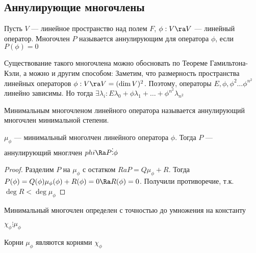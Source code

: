 \subsection{Аннулирующие многочлены}
\begin{definition}
    Пусть \(V\) --- линейное пространство над полем \(F\), \(\phi: V \ra V\) --- линейный оператор. Многочлен \(P\) называется аннулирующим для оператора \(\phi\), если \(P(\phi) = 0\)
\end{definition}

Существование такого многочлена можно обосновать по Теореме Гамильтона-Кэли, а можно и другим способом:
Заметим, что размерность пространства линейных операторов \(\phi: V \ra V = (\dim V)^2\). Поэтому, операторы \(E, \phi, \phi^2 \dots \phi^{n^2}\) линейно зависимы. Но тогда \(\exists \lambda_i: E\lambda_0 + \phi\lambda_1 + \dots + \phi^{n^2}\lambda_{n^2}\)

\begin{definition}
    Минимальным многочленом линейного оператора называется аннулирующий многочлен минимальной степени.
\end{definition}


\begin{proposition}
    \(\mu_\phi\) --- минимальный многолчен линейного оператора \(\phi\). Тогда \(P\) --- аннулирующий многлчен \(phi \Ra P \vdots \phi\)
\end{proposition}
\begin{proof}
    Разделим \(P\) на \(\mu_\phi\) с остатком 
    \(Ra P = Q\mu_\phi + R\). Тогда \(P(\phi) = Q(\phi)\mu_\phi(\phi) + R(\phi) = 0 \Ra R(\phi) = 0\). Получили противоречие, т.к. \(\deg R < \deg \mu_\phi\)
\end{proof}

\begin{corollary}
    Минимальный многочлен определен с точностью до умножения на константу
\end{corollary}

\begin{proposition}
    \(\chi_\phi \vdots \mu_\phi\)
\end{proposition}

\begin{corollary}
    Корни \(\mu_\phi\) являются корнями \(\chi_\phi\)
\end{corollary}

